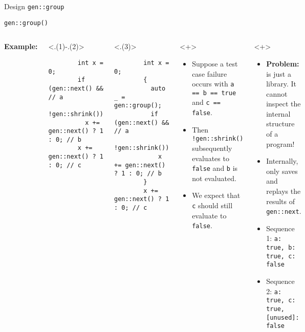 \begin{frame}[fragile,t]{\halcheck{} \textemdash{} Design \textemdash{} \texttt{gen::group}}
  \begin{center}
    \texttt{gen::group()}
  \end{center}

  \begin{columns}[T]
    \textbf{Example:}

    \begin{onlyenv}<.(1)-.(2)>
      \begin{verbatim}
        int x = 0;
        if (gen::next() && // a
            !gen::shrink())
          x += gen::next() ? 1 : 0; // b
        x += gen::next() ? 1 : 0; // c
      \end{verbatim}
    \end{onlyenv}

    \begin{onlyenv}<.(3)>
      \begin{verbatim}
        int x = 0;
        {
          auto _ = gen::group();
          if (gen::next() && // a
              !gen::shrink())
            x += gen::next() ? 1 : 0; // b
        }
        x += gen::next() ? 1 : 0; // c
      \end{verbatim}
    \end{onlyenv}

    \begin{onlyenv}<+>
      \begin{itemize}
        \item Suppose a test case failure occurs with \texttt{a == b == true} and  \texttt{c == false}.
        \item Then \texttt{!gen::shrink()} subsequently evaluates to \texttt{false} and \texttt{b} is not evaluated.
        \item We expect that \texttt{c} should still evaluate to \texttt{false}.
      \end{itemize}
    \end{onlyenv}

    \begin{onlyenv}<+>
      \begin{itemize}
        \item \textbf{Problem:} \halcheck{} is just a library. It cannot inspect the internal structure of a program!
        \item Internally, \halcheck{} only saves and replays the results of \texttt{gen::next}.
        \item Sequence 1: \texttt{{a: true, b: true, c: false}}
        \item Sequence 2: \texttt{{a: true, c: true, [unused]: false}}
      \end{itemize}
    \end{onlyenv}


\end{columns}
\end{frame}
